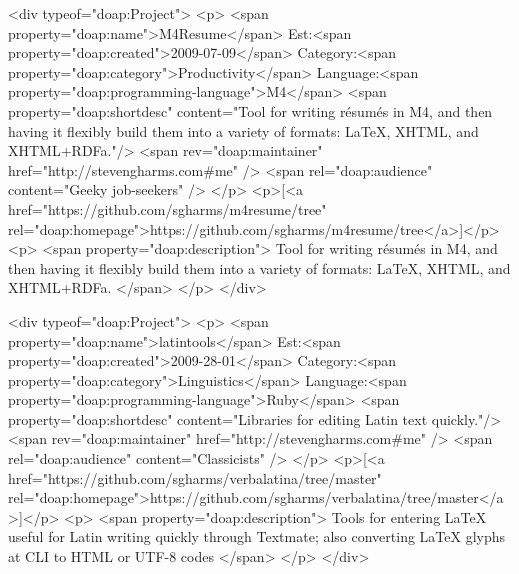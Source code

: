 \documentclass[]{article}
\begin{document}
  <div typeof="doap:Project">
		<p>
			<span property="doap:name">M4Resume</span> Est:<span property="doap:created">2009-07-09</span> 
			Category:<span property="doap:category">Productivity</span>  Language:<span property="doap:programming-language">M4</span>
			<span property="doap:shortdesc" content="Tool for writing résumés in M4, and then having it flexibly build them into a variety of formats:  LaTeX, XHTML, and XHTML+RDFa."/>
			<span rev="doap:maintainer" href="http://stevengharms.com#me" />
			<span rel="doap:audience" content="Geeky job-seekers" />
		</p>
		<p>[<a href="https://github.com/sgharms/m4resume/tree" rel="doap:homepage">https://github.com/sgharms/m4resume/tree</a>]</p>
		<p>
			<span property="doap:description">
				Tool for writing résumés in M4, and then having it flexibly build them into a variety of formats:  LaTeX, XHTML, and XHTML+RDFa.
			</span>
		</p>	
</div>



  <div typeof="doap:Project">
		<p>
			<span property="doap:name">latintools</span> Est:<span property="doap:created">2009-28-01</span> 
			Category:<span property="doap:category">Linguistics</span>  Language:<span property="doap:programming-language">Ruby</span>
			<span property="doap:shortdesc" content="Libraries for editing Latin text quickly."/>
			<span rev="doap:maintainer" href="http://stevengharms.com#me" />
			<span rel="doap:audience" content="Classicists" />
		</p>
		<p>[<a href="https://github.com/sgharms/verbalatina/tree/master" rel="doap:homepage">https://github.com/sgharms/verbalatina/tree/master</a>]</p>
		<p>
			<span property="doap:description">
				Tools for entering LaTeX useful for Latin writing quickly through Textmate; also converting LaTeX glyphs at CLI to HTML or UTF-8 codes
			</span>
		</p>	
</div>
\end{document}
